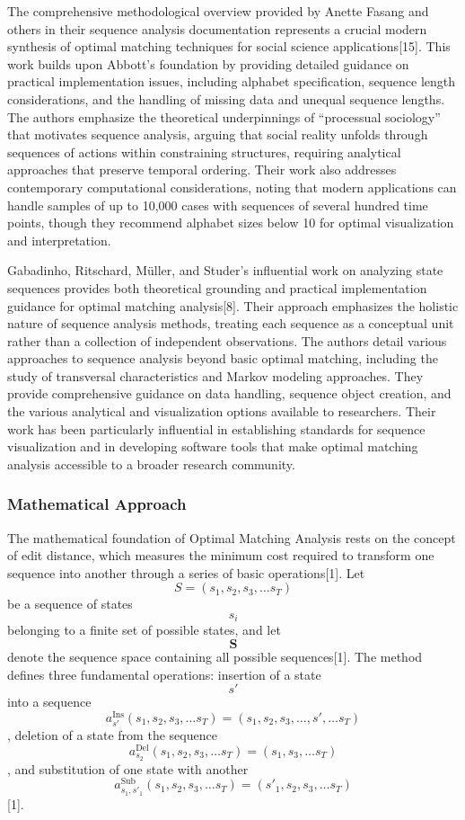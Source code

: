 \documentclass[./main.tex]{subfiles}
\begin{document}
The comprehensive methodological overview provided by Anette Fasang and
others in their sequence analysis documentation represents a crucial
modern synthesis of optimal matching techniques for social science
applications{[}15{]}. This work builds upon Abbott's foundation by
providing detailed guidance on practical implementation issues,
including alphabet specification, sequence length considerations, and
the handling of missing data and unequal sequence lengths. The authors
emphasize the theoretical underpinnings of ``processual sociology'' that
motivates sequence analysis, arguing that social reality unfolds through
sequences of actions within constraining structures, requiring
analytical approaches that preserve temporal ordering. Their work also
addresses contemporary computational considerations, noting that modern
applications can handle samples of up to 10,000 cases with sequences of
several hundred time points, though they recommend alphabet sizes below
10 for optimal visualization and interpretation.

Gabadinho, Ritschard, Müller, and Studer's influential work on analyzing
state sequences provides both theoretical grounding and practical
implementation guidance for optimal matching analysis{[}8{]}. Their
approach emphasizes the holistic nature of sequence analysis methods,
treating each sequence as a conceptual unit rather than a collection of
independent observations. The authors detail various approaches to
sequence analysis beyond basic optimal matching, including the study of
transversal characteristics and Markov modeling approaches. They provide
comprehensive guidance on data handling, sequence object creation, and
the various analytical and visualization options available to
researchers. Their work has been particularly influential in
establishing standards for sequence visualization and in developing
software tools that make optimal matching analysis accessible to a
broader research community.

\subsubsection{Mathematical Approach}\label{mathematical-approach}

The mathematical foundation of Optimal Matching Analysis rests on the
concept of edit distance, which measures the minimum cost required to
transform one sequence into another through a series of basic
operations{[}1{]}. Let \[S=(s_{1},s_{2},s_{3},\ldots s_{T})\] be a
sequence of states \[s_{i}\] belonging to a finite set of possible
states, and let \[\mathbf{S}\] denote the sequence space containing all
possible sequences{[}1{]}. The method defines three fundamental
operations: insertion of a state \[s'\] into a sequence
\[a_{s'}^{\mathrm {Ins}}(s_{1},s_{2},s_{3},\ldots s_{T})=(s_{1},s_{2},s_{3},\ldots ,s',\ldots s_{T})\],
deletion of a state from the sequence
\[a_{s_{2}}^{\mathrm {Del}}(s_{1},s_{2},s_{3},\ldots s_{T})=(s_{1},s_{3},\ldots s_{T})\],
and substitution of one state with another
\[a_{s_{1},s'_{1}}^{\mathrm {Sub}}(s_{1},s_{2},s_{3},\ldots s_{T})=(s'_{1},s_{2},s_{3},\ldots s_{T})\]{[}1{]}.
\end{document}
